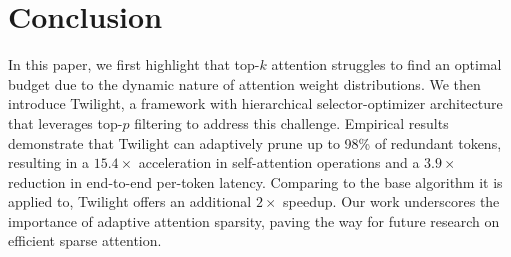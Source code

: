 \section{Conclusion}

In this paper, we first highlight that top-$k$ attention struggles to find an optimal budget due to the dynamic nature of attention weight distributions. We then introduce Twilight, a framework with hierarchical selector-optimizer architecture that leverages top-$p$ filtering to address this challenge. Empirical results demonstrate that Twilight can adaptively prune up to 98\% of redundant tokens, resulting in a $15.4\times$ acceleration in self-attention operations and a $3.9\times$ reduction in end-to-end per-token latency. Comparing to the base algorithm it is applied to, Twilight offers an additional $2\times$ speedup. Our work underscores the importance of adaptive attention sparsity, paving the way for future research on efficient sparse attention.
